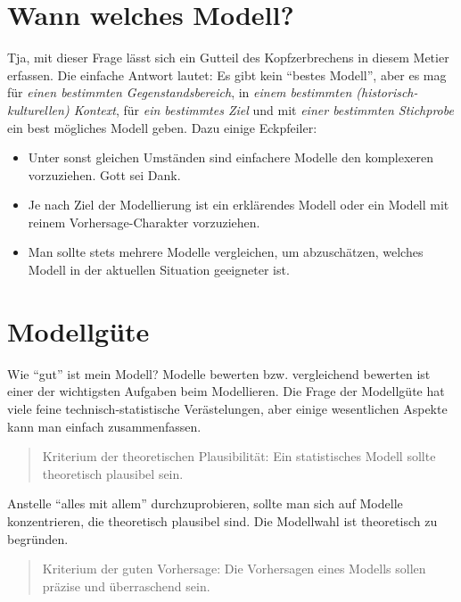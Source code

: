 \documentclass[12pt,ngerman,]{book}
\begin{document}
\section{Wann welches Modell?}\label{wann-welches-modell}

Tja, mit dieser Frage lässt sich ein Gutteil des Kopfzerbrechens in
diesem Metier erfassen. Die einfache Antwort lautet: Es gibt kein
``bestes Modell'', aber es mag für \emph{einen bestimmten
Gegenstandsbereich}, in \emph{einem bestimmten (historisch-kulturellen)
Kontext}, für \emph{ein bestimmtes Ziel} und mit \emph{einer bestimmten
Stichprobe} ein best mögliches Modell geben. Dazu einige Eckpfeiler:

\begin{itemize}
\item
  Unter sonst gleichen Umständen sind einfachere Modelle den komplexeren
  vorzuziehen. Gott sei Dank.
\item
  Je nach Ziel der Modellierung ist ein erklärendes Modell oder ein
  Modell mit reinem Vorhersage-Charakter vorzuziehen.
\item
  Man sollte stets mehrere Modelle vergleichen, um abzuschätzen, welches
  Modell in der aktuellen Situation geeigneter ist.
\end{itemize}

\section{Modellgüte}\label{modellgute}

Wie ``gut'' ist mein Modell? Modelle bewerten bzw. vergleichend bewerten
ist einer der wichtigsten Aufgaben beim Modellieren. Die Frage der
Modellgüte hat viele feine technisch-statistische Verästelungen, aber
einige wesentlichen Aspekte kann man einfach zusammenfassen.

\begin{quote}
Kriterium der theoretischen Plausibilität: Ein statistisches Modell
sollte theoretisch plausibel sein.
\end{quote}

Anstelle ``alles mit allem'' durchzuprobieren, sollte man sich auf
Modelle konzentrieren, die theoretisch plausibel sind. Die Modellwahl
ist theoretisch zu begründen.

\begin{quote}
Kriterium der guten Vorhersage: Die Vorhersagen eines Modells sollen
präzise und überraschend sein.
\end{quote}
\end{document}

